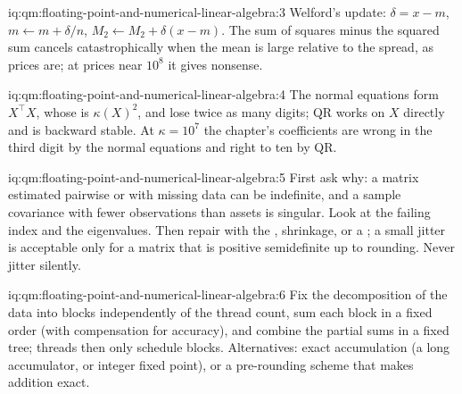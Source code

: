 \begin{solution}{iq:qm:floating-point-and-numerical-linear-algebra:3}
Welford's update: $\delta = x - m$, $m \leftarrow m + \delta/n$, $M_2 \leftarrow M_2 + \delta(x - m)$. The sum of squares minus the squared sum cancels catastrophically when the mean is large
relative to the spread, as prices are; at prices near $10^8$ it gives nonsense.
\end{solution}

\begin{solution}{iq:qm:floating-point-and-numerical-linear-algebra:4}
The normal equations form $X^\top X$, whose  is $\kappa(X)^2$, and lose twice as many digits; QR works on $X$ directly and is backward stable. At $\kappa = 10^7$ the chapter's
coefficients are wrong in the third digit by the normal equations and right to ten by QR.
\end{solution}

\begin{solution}{iq:qm:floating-point-and-numerical-linear-algebra:5}
First ask why: a matrix estimated pairwise or with missing data can be indefinite, and a sample covariance with fewer observations than assets is singular. Look at the failing index and the
eigenvalues. Then repair with the , shrinkage, or a ; a small jitter is acceptable only for a matrix that is positive semidefinite up to rounding. Never
jitter silently.
\end{solution}

\begin{solution}{iq:qm:floating-point-and-numerical-linear-algebra:6}
Fix the decomposition of the data into blocks independently of the thread count, sum each block in a fixed order (with compensation for accuracy), and combine the partial sums in a fixed
tree; threads then only schedule blocks. Alternatives: exact accumulation (a long accumulator, or integer fixed point), or a pre-rounding scheme that makes addition exact.
\end{solution}
